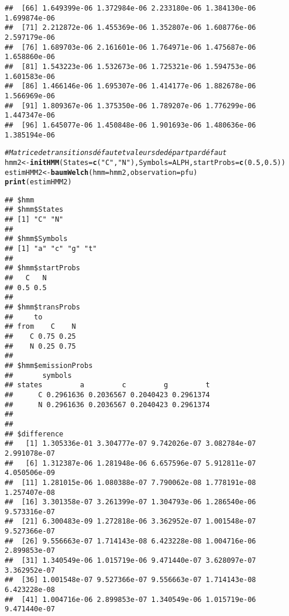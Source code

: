 \documentclass{article}
\makeatletter
\newcommand{\hlnum}[1]{\textcolor[rgb]{0.686,0.059,0.569}{#1}}%
\newcommand{\hlstr}[1]{\textcolor[rgb]{0.192,0.494,0.8}{#1}}%
\newcommand{\hlcom}[1]{\textcolor[rgb]{0.678,0.584,0.686}{\textit{#1}}}%
\newcommand{\hlstd}[1]{\textcolor[rgb]{0.345,0.345,0.345}{#1}}%
\newcommand{\hlkwb}[1]{\textcolor[rgb]{0.69,0.353,0.396}{#1}}%
\newcommand{\hlkwc}[1]{\textcolor[rgb]{0.333,0.667,0.333}{#1}}%
\newcommand{\hlkwd}[1]{\textcolor[rgb]{0.737,0.353,0.396}{\textbf{#1}}}%
\newenvironment{kframe}{%
 \def\at@end@of@kframe{}%
 \ifinner\ifhmode%
  \def\at@end@of@kframe{\end{minipage}}%
  \begin{minipage}{\columnwidth}%
 \fi\fi%
 \def\FrameCommand##1{\hskip\@totalleftmargin \hskip-\fboxsep
 \colorbox{shadecolor}{##1}\hskip-\fboxsep
     \hskip-\linewidth \hskip-\@totalleftmargin \hskip\columnwidth}%
 \MakeFramed {\advance\hsize-\width
   \@totalleftmargin\z@ \linewidth\hsize
   \@setminipage}}%
 {\par\unskip\endMakeFramed%
 \at@end@of@kframe}
\newenvironment{knitrout}{}{} %
\makeatother
\begin{document}
\begin{knitrout}
\begin{kframe}
\begin{verbatim}
##  [66] 1.649399e-06 1.372984e-06 2.233180e-06 1.384130e-06 1.699874e-06
##  [71] 2.212872e-06 1.455369e-06 1.352807e-06 1.608776e-06 2.597179e-06
##  [76] 1.689703e-06 2.161601e-06 1.764971e-06 1.475687e-06 1.658860e-06
##  [81] 1.543223e-06 1.532673e-06 1.725321e-06 1.594753e-06 1.601583e-06
##  [86] 1.466146e-06 1.695307e-06 1.414177e-06 1.882678e-06 1.566969e-06
##  [91] 1.809367e-06 1.375350e-06 1.789207e-06 1.776299e-06 1.447347e-06
##  [96] 1.645077e-06 1.450848e-06 1.901693e-06 1.480636e-06 1.385194e-06
\end{verbatim}
\end{kframe}
\end{knitrout}

\begin{knitrout}
\color{fgcolor}\begin{kframe}
\begin{alltt}
\hlcom{# Matrice de transitions défaut et valeurs de départ par défaut}
\hlstd{hmm2}\hlkwb{<-}\hlkwd{initHMM}\hlstd{(}\hlkwc{States} \hlstd{=} \hlkwd{c}\hlstd{(}\hlstr{"C"}\hlstd{,}\hlstr{"N"}\hlstd{),} \hlkwc{Symbols} \hlstd{= ALPH,}\hlkwc{startProbs} \hlstd{=} \hlkwd{c}\hlstd{(}\hlnum{0.5}\hlstd{,}\hlnum{0.5}\hlstd{))}
\hlstd{estimHMM2}\hlkwb{<-}\hlkwd{baumWelch}\hlstd{(}\hlkwc{hmm} \hlstd{= hmm2,}\hlkwc{observation} \hlstd{= pfu)}
\hlkwd{print}\hlstd{(estimHMM2)}
\end{alltt}
\begin{verbatim}
## $hmm
## $hmm$States
## [1] "C" "N"
## 
## $hmm$Symbols
## [1] "a" "c" "g" "t"
## 
## $hmm$startProbs
##   C   N 
## 0.5 0.5 
## 
## $hmm$transProbs
##     to
## from    C    N
##    C 0.75 0.25
##    N 0.25 0.75
## 
## $hmm$emissionProbs
##       symbols
## states         a         c         g         t
##      C 0.2961636 0.2036567 0.2040423 0.2961374
##      N 0.2961636 0.2036567 0.2040423 0.2961374
## 
## 
## $difference
##   [1] 1.305336e-01 3.304777e-07 9.742026e-07 3.082784e-07 2.991078e-07
##   [6] 1.312387e-06 1.281948e-06 6.657596e-07 5.912811e-07 4.050506e-09
##  [11] 1.281015e-06 1.080388e-07 7.790062e-08 1.778191e-08 1.257407e-08
##  [16] 3.301358e-07 3.261399e-07 1.304793e-06 1.286540e-06 9.573316e-07
##  [21] 6.300483e-09 1.272818e-06 3.362952e-07 1.001548e-07 9.527366e-07
##  [26] 9.556663e-07 1.714143e-08 6.423228e-08 1.004716e-06 2.899853e-07
##  [31] 1.340549e-06 1.015719e-06 9.471440e-07 3.628097e-07 3.362952e-07
##  [36] 1.001548e-07 9.527366e-07 9.556663e-07 1.714143e-08 6.423228e-08
##  [41] 1.004716e-06 2.899853e-07 1.340549e-06 1.015719e-06 9.471440e-07

\end{verbatim}
\end{kframe}
\end{knitrout}
\end{document}
